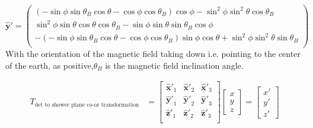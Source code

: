 \documentclass[11pt]{article}
\begin{document}
\begin{equation}
   \mathbf{\hat{y}'}=\left(
    \begin{array}{c}
  (-\sin\phi\sin\theta_B\cos\theta - \cos\phi\cos\theta_B)\cos\phi - \sin^2\phi\sin^2\theta\cos\theta_B\\ 

\sin^2\phi\sin\theta\cos\theta\cos\theta_B - \sin\phi\sin\theta\sin\theta_B\cos\phi\\


-(-\sin\phi\sin\theta_B\cos\theta - \cos\phi\cos\theta_B)\sin\phi\cos\theta + \sin^2\phi\sin^2\theta\sin\theta_B\\
\end{array} 
\right) 
\end{equation}
With the orientation of the magnetic field taking  down i.e. pointing to the center of the earth, as positive,$\theta_B$ is the magnetic field  inclination angle. 


\begin{align*}
T_{\mbox{det  to shower plane co-or transformation}} &= \left[\begin{array}{ccc}
  \mathbf{\hat{x}'} _{1} & \mathbf{\hat{x}'} _{2} & \mathbf{\hat{x}'} _{3} \\
  \mathbf{\hat{y}'} _{1} & \mathbf{\hat{y}'} _{2} & \mathbf{\hat{y}'} _{3}\\
  \mathbf{\hat{z}'} _{1} &\mathbf{\hat{z}'} _{2} & \mathbf{\hat{z}'} _{3} \\
\end{array}\right]
\begin{bmatrix}
  x  \\
  y  \\
  z
\end{bmatrix} 
= \begin{bmatrix}
  x'  \\
  y'  \\
  z'
\end{bmatrix}
\end{align*}
\end{document}

